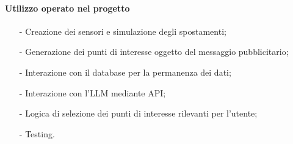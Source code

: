 \documentclass[10pt]{article}
\begin{document}
\begin{justify}
            \paragraph{Utilizzo operato nel progetto}
                \begin{itemize}
                    \item[-] Creazione dei sensori e simulazione degli spostamenti;
                    \item[-] Generazione dei punti di interesse oggetto del messaggio pubblicitario;
                    \item[-] Interazione con il database per la permanenza dei dati;
                    \item[-] Interazione con l'LLM mediante API;
                    \item[-] Logica di selezione dei punti di interesse rilevanti per l'utente;
                    \item[-] Testing.
                \end{itemize}

\end{justify}
\end{document}
